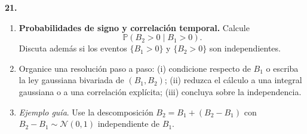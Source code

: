 \documentclass[11pt, letterpaper]{article}
\begin{document}
\newpage

\begin{ejercicio}
    \textbf{21.} 
    \begin{enumerate}
        \item \textbf{Probabilidades de signo y correlación temporal.} Calcule
        $$ \mathbb{P}(B_2 > 0 \mid B_1 > 0). $$
        Discuta además si los eventos $\{B_1 > 0\}$ y $\{B_2 > 0\}$ son independientes.
        \item Organice una resolución paso a paso: (i) condicione respecto de $B_1$ o escriba la ley gaussiana bivariada de $(B_1, B_2)$; (ii) reduzca el cálculo a una integral gaussiana o a una correlación explícita; (iii) concluya sobre la independencia.
        \item \textit{Ejemplo guía}. Use la descomposición $B_2 = B_1 + (B_2 - B_1)$ con $B_2 - B_1 \sim \mathcal{N}(0, 1)$ independiente de $B_1$.
    \end{enumerate}
\end{ejercicio}

\vspace{5mm}
\end{document}

